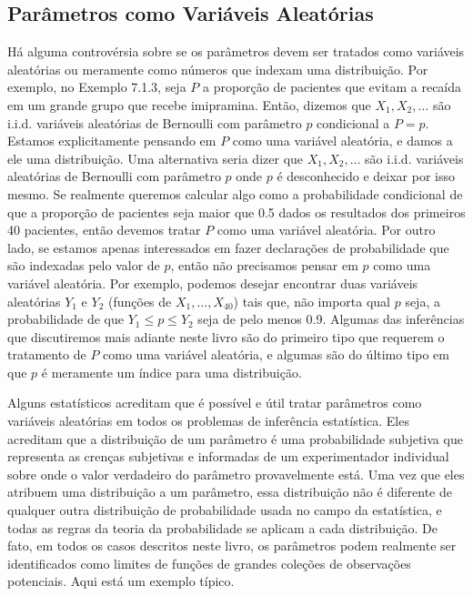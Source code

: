 \subsection*{Parâmetros como Variáveis Aleatórias}
Há alguma controvérsia sobre se os parâmetros devem ser tratados como variáveis aleatórias ou meramente como números que indexam uma distribuição. Por exemplo, no Exemplo 7.1.3, seja $P$ a proporção de pacientes que evitam a recaída em um grande grupo que recebe imipramina. Então, dizemos que $X_1, X_2, \dots$ são i.i.d. variáveis aleatórias de Bernoulli com parâmetro $p$ condicional a $P=p$. Estamos explicitamente pensando em $P$ como uma variável aleatória, e damos a ele uma distribuição. Uma alternativa seria dizer que $X_1, X_2, \dots$ são i.i.d. variáveis aleatórias de Bernoulli com parâmetro $p$ onde $p$ é desconhecido e deixar por isso mesmo.
Se realmente queremos calcular algo como a probabilidade condicional de que a proporção de pacientes seja maior que 0.5 dados os resultados dos primeiros 40 pacientes, então devemos tratar $P$ como uma variável aleatória. Por outro lado, se estamos apenas interessados em fazer declarações de probabilidade que são indexadas pelo valor de $p$, então não precisamos pensar em $p$ como uma variável aleatória. Por exemplo, podemos desejar encontrar duas variáveis aleatórias $Y_1$ e $Y_2$ (funções de $X_1, \dots, X_{40}$) tais que, não importa qual $p$ seja, a probabilidade de que $Y_1 \le p \le Y_2$ seja de pelo menos 0.9. Algumas das inferências que discutiremos mais adiante neste livro são do primeiro tipo que requerem o tratamento de $P$ como uma variável aleatória, e algumas são do último tipo em que $p$ é meramente um índice para uma distribuição.

\vspace{0.5cm}
Alguns estatísticos acreditam que é possível e útil tratar parâmetros como variáveis aleatórias em todos os problemas de inferência estatística. Eles acreditam que a distribuição de um parâmetro é uma probabilidade subjetiva que representa as crenças subjetivas e informadas de um experimentador individual sobre onde o valor verdadeiro do parâmetro provavelmente está. Uma vez que eles atribuem uma distribuição a um parâmetro, essa distribuição não é diferente de qualquer outra distribuição de probabilidade usada no campo da estatística, e todas as regras da teoria da probabilidade se aplicam a cada distribuição. De fato, em todos os casos descritos neste livro, os parâmetros podem realmente ser identificados como limites de funções de grandes coleções de observações potenciais. Aqui está um exemplo típico.

